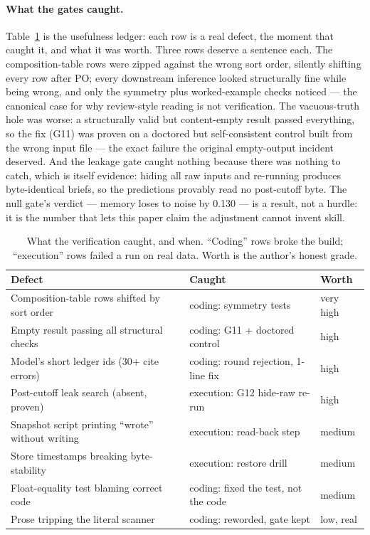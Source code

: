 \documentclass[11pt]{article}
\begin{document}
\paragraph{What the gates caught.} Table~\ref{tab:catches} is the usefulness
ledger: each row is a real defect, the moment that caught it, and what it was
worth. Three rows deserve a sentence each. The composition-table rows were
zipped against the wrong sort order, silently shifting every row after PO;
every downstream inference looked structurally fine while being wrong, and
only the symmetry plus worked-example checks noticed --- the canonical case
for why review-style reading is not verification. The vacuous-truth hole was
worse: a structurally valid but content-empty result passed everything, so
the fix (G11) was proven on a doctored but self-consistent control built
from the wrong input file --- the exact failure the original empty-output
incident deserved. And the leakage gate caught nothing because there was
nothing to catch, which is itself evidence: hiding all raw inputs and
re-running produces byte-identical briefs, so the predictions provably read
no post-cutoff byte. The null gate's verdict --- memory loses to noise by
0.130 --- is a result, not a hurdle: it is the number that lets this paper
claim the adjustment cannot invent skill.

\begin{table}[t]
\centering
\caption{What the verification caught, and when. ``Coding'' rows broke the
build; ``execution'' rows failed a run on real data. Worth is the author's
honest grade.}
\label{tab:catches}
\footnotesize
\begin{tabular}{lll}
\toprule
Defect & Caught & Worth \\
\midrule
Composition-table rows shifted by sort order & coding: symmetry tests & very high \\
Empty result passing all structural checks & coding: G11 + doctored control & high \\
Model's short ledger ids (30+ cite errors) & coding: round rejection, 1-line fix & high \\
Post-cutoff leak search (absent, proven) & execution: G12 hide-raw re-run & high \\
Snapshot script printing ``wrote'' without writing & execution: read-back step & medium \\
Store timestamps breaking byte-stability & execution: restore drill & medium \\
Float-equality test blaming correct code & coding: fixed the test, not the code & medium \\
Prose tripping the literal scanner & coding: reworded, gate kept & low, real \\
\bottomrule
\end{tabular}
\normalsize
\end{table}
\end{document}
